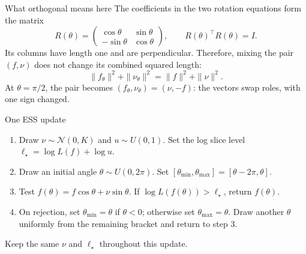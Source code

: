 \documentclass[aspectratio=169,11pt]{beamer}
\begin{document}
\begin{frame}{What orthogonal means here}
  The coefficients in the two rotation equations form the matrix
  \[
    R(\theta)=
    \begin{pmatrix}
      \cos\theta & \sin\theta\\
      -\sin\theta & \cos\theta
    \end{pmatrix},
    \qquad R(\theta)^\top R(\theta)=I.
  \]
  Its columns have length one and are perpendicular. Therefore, mixing
  the pair \((f,\nu)\) does not change its combined squared length:
  \[
    \|f_\theta\|^2+\|\nu_\theta\|^2
      =\|f\|^2+\|\nu\|^2.
  \]
  At \(\theta=\pi/2\), the pair becomes
  \((f_\theta,\nu_\theta)=(\nu,-f)\): the vectors swap roles,
  with one sign changed.
\end{frame}

\begin{frame}{One ESS update}
  \begin{enumerate}
    \setlength{\itemsep}{0.55em}
    \item Draw \(\nu\sim\mathcal N(0,K)\) and \(u\sim U(0,1)\). Set the
      log slice level \(\ell_\star=\log L(f)+\log u\).
    \item Draw an initial angle \(\theta\sim U(0,2\pi)\).
      Set \([\theta_{\min},\theta_{\max}]=[\theta-2\pi,\theta]\).
    \item Test \(f(\theta)=f\cos\theta+\nu\sin\theta\).
      If \(\log L(f(\theta))>\ell_\star\), return \(f(\theta)\).
    \item On rejection, set \(\theta_{\min}=\theta\) if \(\theta<0\);
      otherwise set \(\theta_{\max}=\theta\).
      Draw another \(\theta\) uniformly from the remaining bracket
      and return to step 3.
  \end{enumerate}
  \vspace{0.45em}
  Keep the same \(\nu\) and \(\ell_\star\) throughout this update.
\end{frame}
\end{document}
